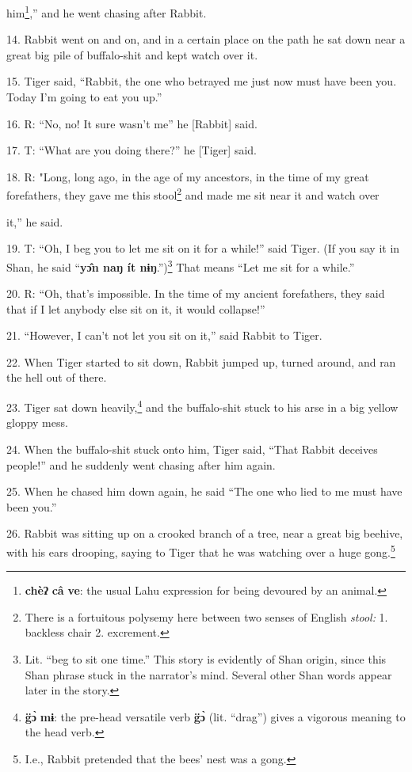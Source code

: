him\footnote{\textbf{chèʔ} \textbf{câ} \textbf{ve}: the usual Lahu expression for being devoured by an animal.},'' and he went chasing after Rabbit.




14. Rabbit went on and on, and in a certain place on the path he
sat down near a great big pile of buffalo-shit and kept watch over it.


15. Tiger said, ``Rabbit, the one who betrayed me just now must have been you.
Today I'm going to eat you up.''

16. R: ``No, no! It sure wasn't me'' he [Rabbit] said.

17. T: ``What are you doing there?'' he [Tiger] said.

18. R: "Long, long ago, in the age of my ancestors, in the time of my
great forefathers, they gave me this stool\footnote{There is a fortuitous polysemy here between two senses of English \textit{stool: }1. backless chair 2. excrement.} and made me sit near it and watch
over

it,'' he said.

19. T: ``Oh, I beg you to let me sit on it for a while!'' said Tiger. (If you say
it in Shan, he said ``\textbf{yɔ̂n naŋ ít nɨŋ}.'')\footnote{Lit. ``beg to sit one time.'' This story is evidently of Shan origin, since this Shan phrase stuck in the narrator's mind. Several other Shan words appear later in the story.} That means ``Let me
sit for a while.''

20. R: ``Oh, that's impossible. In the time of my ancient forefathers, they said
that if I let anybody else sit on it, it would collapse!''

21. ``However, I can't not let you sit on it,'' said Rabbit to Tiger.

22. When Tiger started to sit down, Rabbit jumped up, turned around, and ran the
hell out of there.

23. Tiger sat down heavily,\footnote{\textbf{g̈ɔ̀} \textbf{mɨ}: the pre-head versatile verb \textbf{g̈ɔ̀} (lit. ``drag'') gives a vigorous meaning to the head verb.} and the buffalo-shit stuck to his arse in a big
yellow gloppy mess.

24. When the buffalo-shit stuck onto him, Tiger said, ``That Rabbit deceives people!''
and he suddenly went chasing after him again.

25. When he chased him down again, he said ``The one who lied to me must have been
you.''

26. Rabbit was sitting up on a crooked branch of a tree, near a great big beehive,
with his ears drooping, saying to Tiger that he was watching over a huge gong.\footnote{I.e., Rabbit pretended that the bees' nest was a gong.}

